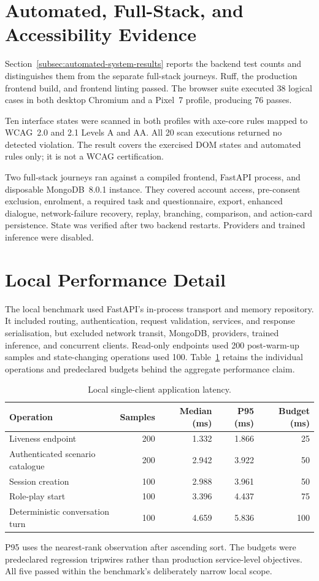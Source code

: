 \section{Automated, Full-Stack, and Accessibility Evidence}

Section~\ref{subsec:automated-system-results} reports the backend test counts and distinguishes them from the separate full-stack journeys. Ruff, the production frontend build, and frontend linting passed. The browser suite executed 38 logical cases in both desktop Chromium and a Pixel~7 profile, producing 76 passes.

Ten interface states were scanned in both profiles with axe-core rules mapped to WCAG~2.0 and 2.1 Levels A and AA. All 20 scan executions returned no detected violation. The result covers the exercised DOM states and automated rules only; it is not a WCAG certification.

Two full-stack journeys ran against a compiled frontend, FastAPI process, and disposable MongoDB~8.0.1 instance. They covered account access, pre-consent exclusion, enrolment, a required task and questionnaire, export, enhanced dialogue, network-failure recovery, replay, branching, comparison, and action-card persistence. State was verified after two backend restarts. Providers and trained inference were disabled.

\section{Local Performance Detail}

The local benchmark used FastAPI's in-process transport and memory repository. It included routing, authentication, request validation, services, and response serialisation, but excluded network transit, MongoDB, providers, trained inference, and concurrent clients. Read-only endpoints used 200 post-warm-up samples and state-changing operations used 100. Table~\ref{tab:performance-results} retains the individual operations and predeclared budgets behind the aggregate performance claim.

\begin{table}[htbp]
\centering
\caption{Local single-client application latency.}
\label{tab:performance-results}
\small
\setlength{\tabcolsep}{4pt}
\begin{tabularx}{\textwidth}{|X|r|r|r|r|}
\hline
\textbf{Operation} & \textbf{Samples} & \textbf{Median (ms)} & \textbf{P95 (ms)} & \textbf{Budget (ms)} \\ \hline
Liveness endpoint & 200 & 1.332 & 1.866 & 25 \\ \hline
Authenticated scenario catalogue & 200 & 2.942 & 3.922 & 50 \\ \hline
Session creation & 100 & 2.988 & 3.961 & 50 \\ \hline
Role-play start & 100 & 3.396 & 4.437 & 75 \\ \hline
Deterministic conversation turn & 100 & 4.659 & 5.836 & 100 \\ \hline
\end{tabularx}
\end{table}

P95 uses the nearest-rank observation after ascending sort. The budgets were predeclared regression tripwires rather than production service-level objectives. All five passed within the benchmark's deliberately narrow local scope.
